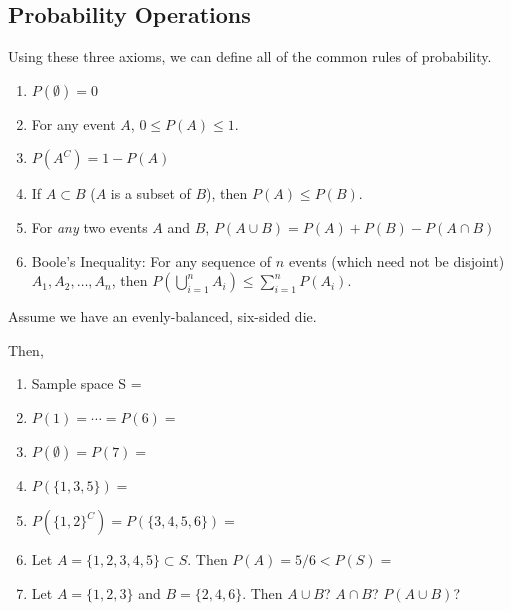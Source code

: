 \documentclass[
]{book}
\begin{document}
\hypertarget{probability-operations}{%
\subsection*{Probability Operations}\label{probability-operations}}

Using these three axioms, we can define all of the common rules of probability.

\begin{enumerate}
\def\labelenumi{\arabic{enumi}.}
\tightlist
\item
  \(P(\emptyset)=0\)
\item
  For any event \(A\), \(0\le P(A) \le 1\).
\item
  \(P({A}^C)=1-P(A)\)
\item
  If \(A\subset B\) (\(A\) is a subset of \(B\)), then \(P(A)\le P(B)\).
\item
  For \emph{any} two events \(A\) and \(B\), \(P(A\cup B)=P(A)+P(B)-P(A\cap B)\)
\item
  Boole's Inequality: For any sequence of \(n\) events (which need not be disjoint) \(A_1,A_2,\ldots,A_n\), then \(P\left( \bigcup\limits_{i=1}^n A_i\right) \leq \sum\limits_{i=1}^n P(A_i)\).
\end{enumerate}

\begin{example}[Probability]
\protect\hypertarget{exm:prob}{}\label{exm:prob}

Assume we have an evenly-balanced, six-sided die.

Then,

\begin{enumerate}
\def\labelenumi{\arabic{enumi}.}
\tightlist
\item
  Sample space S =
\item
  \(P(1)=\cdots=P(6)=\)
\item
  \(P(\emptyset)=P(7)=\)
\item
  \(P\left( \{ 1, 3, 5 \} \right)=\)
\item
  \(P\left( \{ 1, 2 \}^C \right)= P\left( \{ 3, 4, 5, 6 \}\right)=\)
\item
  Let \(A=\{ 1,2,3,4,5 \}\subset S\). Then \(P(A)=5/6<P(S)=\)
\item
  Let \(A=\{ 1, 2, 3 \}\) and \(B=\{ 2, 4, 6 \}\). Then \(A\cup B\)? \(A\cap B\)? \(P(A \cup B)\)?
\end{enumerate}

\end{example}
\end{document}
